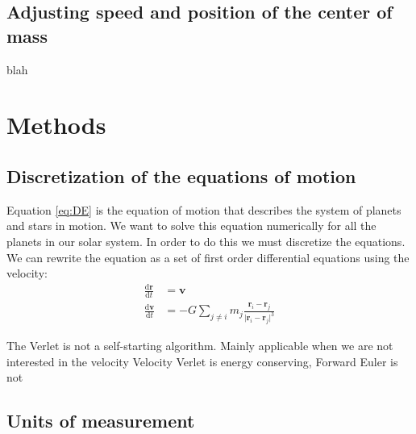 \documentclass[reprint, english,notitlepage,nofootinbib]{revtex4-1}  %
\newcommand{\vc}[1]{\mathbf{#1}}
\begin{document}
\subsection{Adjusting speed and position of the center of mass}
blah

\section{Methods}

\subsection{Discretization of the equations of motion}

Equation \ref{eq:DE} is the equation of motion that describes the system of planets and stars in motion. We want to solve this equation numerically for all the planets in our solar system. In order to do this we must discretize the equations. We can rewrite the equation as a set of first order differential equations using the velocity:
\begin{align*}
   \frac{\mathrm d \vc r}{\mathrm d t} &= \vc v \\
   \frac{\mathrm d \vc v}{\mathrm d t} &= - G \sum_{j \neq i} m_j \frac{\vc r_i - \vc r_j}{ \lvert \vc r_i - \vc r_j \rvert ^3}
\end{align*}

The Verlet is not a self-starting algorithm.
Mainly applicable when we are not interested in the velocity
Velocity Verlet is energy conserving, Forward Euler is not


\subsection{Units of measurement}
\end{document}
